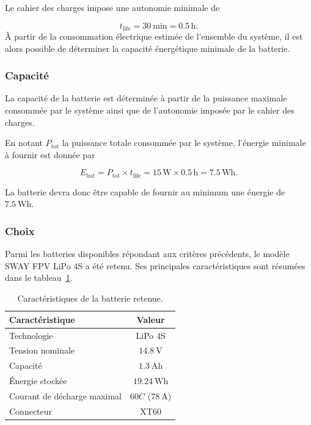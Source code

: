 Le cahier des charges impose une autonomie minimale de

\begin{equation}
t_{\mathrm{life}}=\SI{30}{\minute}=0.5\,\si{\hour}.
\end{equation}
À partir de la consommation électrique estimée de l'ensemble du système, il est alors possible de déterminer la capacité énergétique minimale de la batterie.

\subsubsection{Capacité}

La capacité de la batterie est déterminée à partir de la puissance maximale consommée par le système ainsi que de l'autonomie imposée par le cahier des charges.

En notant $P_{\mathrm{tot}}$ la puissance totale consommée par le système, l'énergie minimale à fournir est donnée par

\begin{equation}
E_{\mathrm{bat}}
=
P_{\mathrm{tot}}\times t_{\mathrm{life}}
=
15\,\si{\watt}
\times
0.5\,\si{\hour}
=
7.5\,\si{\watt\hour}.
\end{equation}

La batterie devra donc être capable de fournir au minimum une énergie de
$\SI{7.5}{\watt\hour}$.

\subsubsection{Choix}

Parmi les batteries disponibles répondant aux critères précédents, le modèle
SWAY FPV LiPo 4S \cite{SWAY-FPV_LiPo-4S} a été retenu. Ses principales caractéristiques sont résumées dans le tableau~\ref{tab:batterie}.

\begin{table}[H]
\centering
\begin{tabular}{|l|c|}
\hline
\textbf{Caractéristique} & \textbf{Valeur} \\
\hline
Technologie & LiPo 4S \\
\hline
Tension nominale & $\SI{14.8}{\volt}$ \\
\hline
Capacité & $\SI{1.3}{\ampere\hour}$ \\
\hline
Énergie stockée & $\SI{19.24}{\watt\hour}$ \\
\hline
Courant de décharge maximal & $60C$ ($\SI{78}{\ampere}$) \\
\hline
Connecteur & XT60 \\
\hline
\end{tabular}
\caption{Caractéristiques de la batterie retenue.}
\label{tab:batterie}
\end{table}

